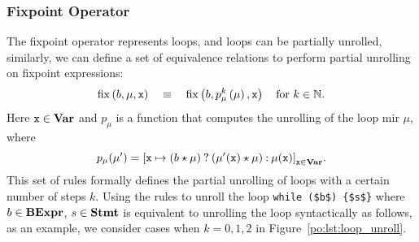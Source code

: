 \subsubsection{Fixpoint Operator}

The fixpoint operator represents loops, and loops can be partially unrolled,
similarly, we can define a set of equivalence relations to perform partial
unrolling on fixpoint expressions:
\begin{equation}
    \operatorname{\mathrm{fix}}\left(b, \mu, \texttt{x}\right)
    \quad \equiv \quad
    \operatorname{\mathrm{fix}}\left(b, p_\mu^k \left(\mu\right), \texttt{x}\right)
    \quad \text{for $k \in \mathbb{N}$}.
    \label{po:eq:unroll}
\end{equation}
Here $\texttt{x} \in \mathbf{Var}$ and $p_\mu$ is a function that computes the unrolling
of the loop \gls{mir} $\mu$, where
\begin{equation}
    p_\mu(\mu^\prime) = {\left[
        \texttt{x} \mapsto ( b \mathbin{\star} \mu ) \mathbin{?}
            ( \mu^\prime(\texttt{x}) \mathbin{\star} \mu ) \mathbin{:} \mu(\texttt{x})
    \right]}_{\texttt{x} \in \mathbf{Var}}.
\end{equation}
This set of rules formally defines the partial unrolling of loops with
a certain number of steps $k$.  Using the rules to unroll the loop
\lstinline[basicstyle=\tt]|while ($b$) {$s$}| where $b \in \mathbf{BExpr}$,
$s \in \mathbf{Stmt}$ is equivalent to unrolling the loop syntactically
as follows, as an example, we consider cases when $k = 0, 1, 2$ in
Figure~\ref{po:lst:loop_unroll}.
